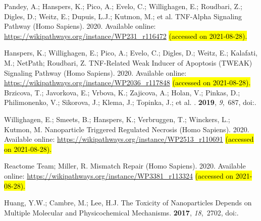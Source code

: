 \documentclass[ijms,article,accept,moreauthors,pdftex]{Definitions/mdpi}
\begin{document}
\begin{thebibliography}{999}
Pandey, A.; Hanspers, K.; Pico, A.; Evelo, C.;  Willighagen, E.; Roudbari, Z.; Digles, D.; Weitz, E.; Dupuis, L.J.; Kutmon, M.; et al.
\newblock TNF-Alpha Signaling Pathway (Homo Sapiens). 2020. 
\newblock Available online: \url{https://wikipathways.org/instance/WP231_r116472} \hl{(accessed on 2021-08-28). } %

Hanspers, K.; Willighagen, E.; Pico, A.; Evelo, C.; Digles, D.; Weitz, E.;
  Kalafati, M.; NetPath; Roudbari, Z.
\newblock TNF-Related Weak Inducer of Apoptosis (TWEAK) Signaling Pathway (Homo
  Sapiens).  2020.
\newblock Available online: \url{https://wikipathways.org/instance/WP2036_r117848} \hl{(accessed on 2021-08-28). } %
Brzicova, T.; Javorkova, E.; Vrbova, K.; Zajicova, A.; Holan, V.; Pinkas, D.;
  Philimonenko, V.; Sikorova, J.; Klema, J.; Topinka, J.; et al.
.
 {\bf 2019}, {\em 9},~687,
\newblock
  doi:{\href{https://doi.org/10.3390/nano9050687}{}}.

Willighagen, E.; Smeets, B.; Hanspers, K.; Verbruggen, T.; Winckers, L.;
  Kutmon, M.
\newblock Nanoparticle Triggered Regulated Necrosis (Homo Sapiens). 2020.
\newblock Available online: \url{https://wikipathways.org/instance/WP2513_r110691} \hl{(accessed on 2021-08-28). } %

{Reactome Team}; Miller, R.
\newblock Mismatch Repair (Homo Sapiens). 2020.
\newblock Available online: \url{https://wikipathways.org/instance/WP3381_r113324} \hl{(accessed on 2021-08-28). } %

Huang, Y.W.; Cambre, M.; Lee, H.J.
\newblock The Toxicity of Nanoparticles Depends on Multiple Molecular and
  Physicochemical Mechanisms.
 {\bf 2017}, {\em
  18},~2702,
\newblock
  doi:{\href{https://doi.org/10.3390/ijms18122702}{}}.


\end{thebibliography}
\end{document}
